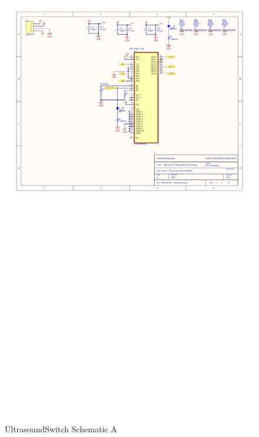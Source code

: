 \begin{landscape}
	\begin{figure}[htbp]
		\centering
		\includegraphics[width=20cm,height=28.7cm,keepaspectratio]{Figures/appendix/ultrasound_switch.pdf}
		\caption{UltrasoundSwitch Schematic A}
		\label{fig:appendix_ultrasoundswitch_a}
	\end{figure}
\end{landscape}
